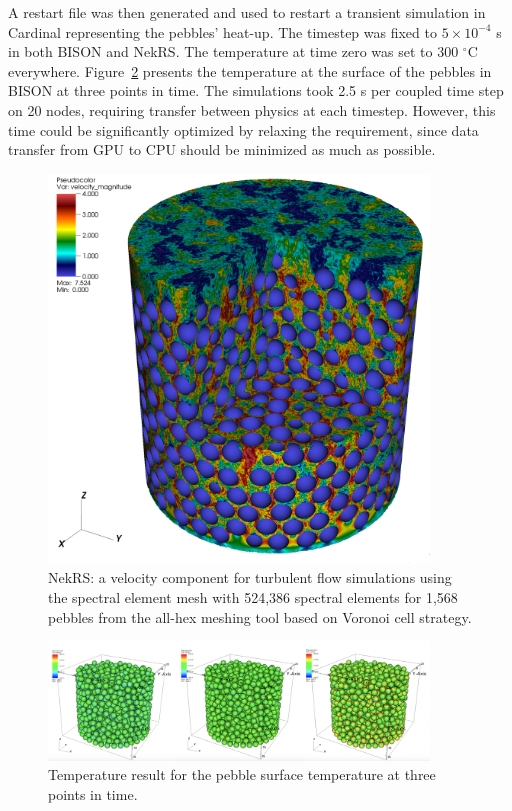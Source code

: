 A restart file was then generated and used to restart a transient simulation in Cardinal representing the pebbles' heat-up. The timestep was fixed to $5\times 10^{-4}$ s in both BISON and NekRS. The temperature at time zero was set to 300 $^{\circ}$C everywhere. Figure~\ref{f:ndemo4} presents the temperature at the surface of the pebbles in BISON at three points in time. The simulations took 2.5 s per coupled time step on 20 nodes, requiring transfer between physics at each timestep. However, this time could be significantly optimized by relaxing the requirement, since data transfer from GPU to CPU should be minimized as much as possible.

\begin{figure}[!h]
\centering
\includegraphics[clip=true,width=0.9\textwidth]{Figures/ndemo_r3}
\caption{NekRS: a velocity component for turbulent flow simulations using the spectral element mesh 
with 524,386 spectral elements for 1,568 pebbles from the all-hex meshing tool based on Voronoi cell strategy. }
\label{f:ndemo3}
\end{figure}


\begin{figure}[!h]
\centering
\includegraphics[clip=true,width=0.9\textwidth]{Figures/ndemo_r4}
\caption{Temperature result for the pebble surface temperature at three points in time.}
\label{f:ndemo4}
\end{figure}

